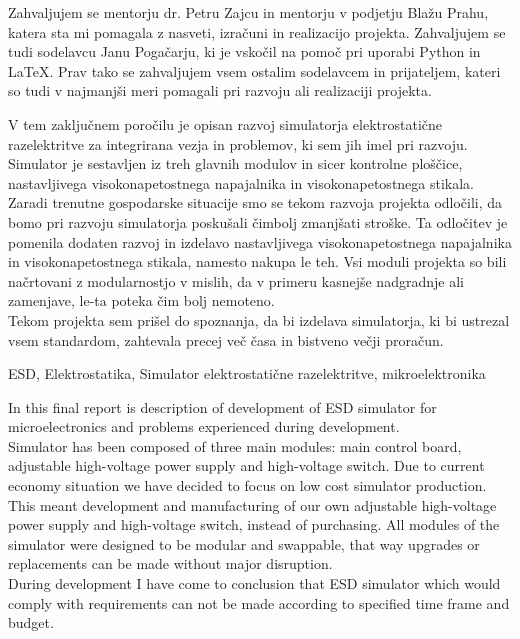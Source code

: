 \documentclass[a4paper,twoside,openright,12pt,Slovene]{book}
\date{Ljubljana, \the\year}
\begin{document}
\frontmatter


\maketitle

\zahvala
Zahvaljujem se mentorju dr. Petru Zajcu in mentorju v podjetju Blažu Prahu, katera sta mi pomagala z nasveti, izračuni in realizacijo projekta. Zahvaljujem se tudi sodelavcu Janu Pogačarju, ki je vskočil na pomoč pri uporabi Python in LaTeX. Prav tako se zahvaljujem vsem ostalim sodelavcem in prijateljem, kateri so tudi v najmanjši meri pomagali pri razvoju ali realizaciji projekta.


\povzetek
V tem zaključnem poročilu je opisan razvoj simulatorja elektrostatične razelektritve za integrirana vezja in problemov, ki sem jih imel pri razvoju. 
~\\Simulator je sestavljen iz treh glavnih modulov in sicer kontrolne ploščice, nastavljivega visokonapetostnega napajalnika in visokonapetostnega stikala.
Zaradi trenutne gospodarske situacije smo se tekom razvoja projekta odločili, da bomo pri razvoju simulatorja poskušali čimbolj zmanjšati stroške. Ta odločitev je pomenila dodaten razvoj in izdelavo nastavljivega visokonapetostnega napajalnika in visokonapetostnega stikala, namesto nakupa le teh. 
Vsi moduli projekta so bili načrtovani z modularnostjo v mislih, da v primeru kasnejše nadgradnje ali zamenjave, le-ta poteka čim bolj nemoteno. 
~\\Tekom projekta sem prišel do spoznanja, da bi izdelava simulatorja, ki bi ustrezal vsem standardom, zahtevala precej več časa in bistveno večji proračun.

\kljucnebesede
ESD, Elektrostatika, Simulator elektrostatične razelektritve, mikroelektronika



\abstract
In this final report is description of development of ESD simulator for microelectronics and problems experienced during development. 
~\\Simulator has been composed of three main modules: main control board, adjustable high-voltage power supply and high-voltage switch. Due to current economy situation we have decided to focus on low cost simulator production. This meant development and manufacturing of our own adjustable high-voltage power supply and high-voltage switch, instead of purchasing. All modules of the simulator were designed to be modular and swappable, that way upgrades or replacements can be made without major disruption. 
~\\During development I have come to conclusion that ESD simulator which would comply with requirements can not be made according to specified time frame and budget.
\end{document}

